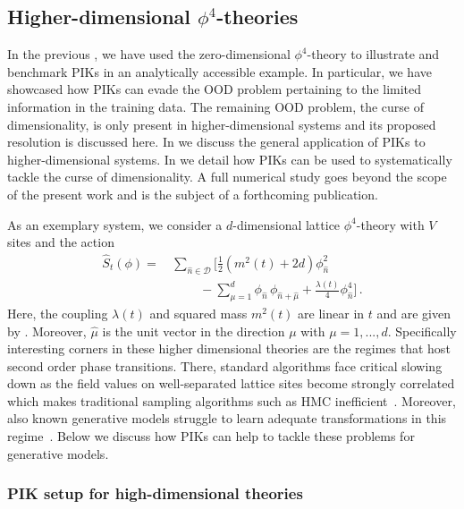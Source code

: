 \documentclass[reprint,amsmath,amssymb,aps,pra,superscriptaddress,nofootinbib,twocolumn,floatfix,nolongbibliography]{revtex4-2}
\begin{document}
\subsection{Higher-dimensional $\phi^4$-theories}
\label{sec:phi4-dD}

In the previous , we have used the zero-dimensional $\phi^4$-theory to illustrate and benchmark PIKs in an analytically accessible example. In particular, we have showcased how PIKs can evade the OOD problem pertaining to the limited information in the training data. The remaining OOD problem, the curse of dimensionality, is only present in higher-dimensional systems and its proposed resolution is discussed here. In  we discuss the general application of PIKs to higher-dimensional systems. In  we detail how PIKs can be used to systematically tackle the curse of dimensionality. A full numerical study goes beyond the scope of the present work and is the subject of a forthcoming publication.

As an exemplary system, we consider a $d$-dimensional lattice $\phi^4$-theory with $V$ sites and the action
%
\begin{align}\nonumber 
      \hat{S}_t(\phi) = &\,\sum_{\hat{n}\in \mathcal{D}} \Bigg[ \frac{1}{2} \left(m^2(t) + 2d\right) \phi_{\hat{n}}^2 \\[1ex]
      &\hspace{1cm}- \sum_{\mu=1}^d \phi^{\phantom{}}_{\hat{n}}\,\phi^{\phantom{}}_{\hat{n}+\hat{\mu}} + \frac{\lambda(t)}{4}\phi_{\hat{n}}^4 \Bigg]\,. 
 \label{eq:Phi4Action_dDimensional}
 \end{align}
%
Here, the coupling $\lambda(t)$ and squared mass $m^2(t)$ are linear in $t$ and are given by . Moreover, $\hat{\mu}$ is the unit vector in the direction $\mu$ with $\mu=1,...,d$. Specifically interesting corners in these higher dimensional theories are the regimes that host second order phase transitions. There, standard algorithms face critical slowing down as the field values on well-separated lattice sites become strongly correlated which makes traditional sampling algorithms such as HMC inefficient~\cite{Wolff:1989wq}. Moreover, also known generative models struggle to learn adequate transformations in this regime~\cite{Abott:2022ass,DelDebbio:2021emt}. Below we discuss how PIKs can help to tackle these problems for generative models.


\subsubsection{PIK setup for high-dimensional theories}
\label{eq:PIK-Highd}
\end{document}
